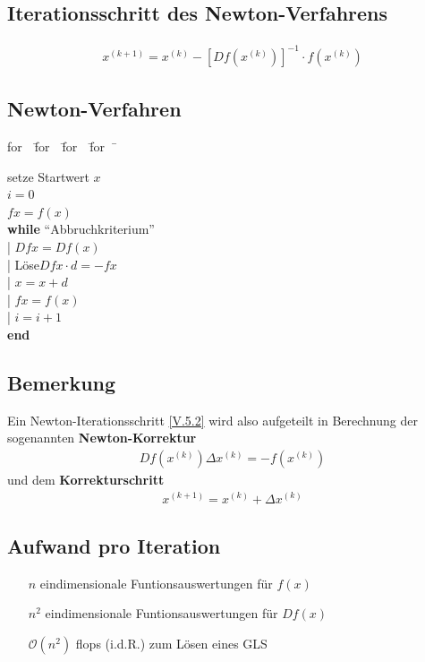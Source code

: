 \documentclass[ngerman,fontsize=11pt, paper=a4, parskip=half, titlepage=true, toc=bib]{scrbook}
\newenvironment{pseudocode}[1]{ %
  \begin{minipage}{#1}
    \begin{framed}
      \hspace*{1em}	
      \begin{minipage}{#1}
        \begin{tabbing}
          for~~\= for~~\= for~~\= for~~\= \kill
	}
	{ %
        \end{tabbing}
      \end{minipage}
      \hspace*{1em}
    \end{framed}
  \end{minipage}
}
\begin{document}
  \subsection{Iterationsschritt des Newton-Verfahrens}
  \begin{gather}
    x^{(k+1)} = x^{(k)} -[Df(x^{(k)})]^{-1}\cdot f(x^{(k)})
    \label{V.5.2}
  \end{gather}
  
  \subsection{Newton-Verfahren}
  \begin{pseudocode}{0.5\linewidth}
    setze Startwert $x$ \\
    $i=0$ \\
    $fx= f(x)$ \\
    \textbf{while} \enquote{Abbruchkriterium} \\
    |	\> $Dfx = Df(x)$ \\
    |	\> Löse\footnotemark $Dfx\cdot d=-fx$ \\
    |	\> $x=x+d$ \\
    |	\> $fx=f(x)$\\
    |	\> $i=i+1$\\
    \textbf{end}
  \end{pseudocode}
  
  \subsection{Bemerkung}
  Ein Newton-Iterationsschritt \eqref{V.5.2} wird also aufgeteilt in Berechnung
  der sogenannten \textbf{Newton-Korrektur}
  \begin{gather}
    Df(x^{(k)})\Delta x^{(k)} = -f(x^{(k)}) \label{V.5.3}
  \end{gather}
  und dem \textbf{Korrekturschritt}
  \begin{gather}
    x^{(k+1)}= x^{(k)}+\Delta x^{(k)} \label{V.5.4}
  \end{gather}
  
  \subsection{Aufwand pro Iteration}
  \begin{itemize}
  \item[\textbf{$n$}] eindimensionale Funtionsauswertungen für $f(x)$
  \item[\textbf{$n^2$}] eindimensionale Funtionsauswertungen für $Df(x)$
  \item[$\mathcal{O}(n^2)$] flops (i.d.R.) zum Lösen eines GLS
  \end{itemize}
  
\end{document}
